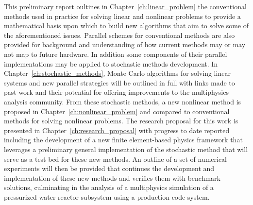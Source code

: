 This preliminary report oultines in Chapter~\ref{ch:linear_problem}
the conventional methods used in practice for solving linear and
nonlinear problems to provide a mathematical basis upon which to build
new algorithms that aim to solve some of the aforementioned
issues. Parallel schemes for conventional methods are also provided
for background and understanding of how current methods may or may not
map to future hardware. In addition some components of their parallel
implementations may be applied to stochastic methods development. In
Chapter~\ref{ch:stochastic_methods}, Monte Carlo algorithms for
solving linear systems and new parallel strategies will be outlined in
full with links made to past work and their potential for offering
improvements to the multiphysics analysis community. From these
stochastic methods, a new nonlinear method is proposed in
Chapter~\ref{ch:nonlinear_problem} and compared to conventional
methods for solving nonlinear problems. The research proposal for this
work is presented in Chapter~\ref{ch:research_proposal} with progress
to date reported including the development of a new finite
element-based physics framework that leverages a preliminary general
implementation of the stochastic method that will serve as a test bed
for these new methods. An outline of a set of numerical experiments
will then be provided that continues the development and
implementation of these new methods and verifies them with benchmark
solutions, culminating in the analysis of a multiphysics simulation of
a pressurized water reactor subsystem using a production code system.
